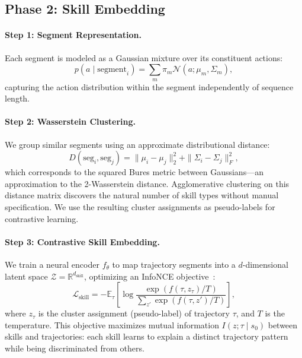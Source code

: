 \documentclass{article}
\begin{document}
\subsection{Phase 2: Skill Embedding}

\paragraph{Step 1: Segment Representation.}
Each segment is modeled as a Gaussian mixture over its constituent actions:
\begin{equation}
p(a \mid \text{segment}_i) = \sum_{m} \pi_m \mathcal{N}(a; \mu_m, \Sigma_m),
\end{equation}
capturing the action distribution within the segment independently of sequence length.

\paragraph{Step 2: Wasserstein Clustering.}
We group similar segments using an approximate distributional distance:
\begin{equation}
D(\text{seg}_i, \text{seg}_j) = \| \mu_i - \mu_j \|_2^2 + \| \Sigma_i - \Sigma_j \|_F^2,
\label{eq:bures}
\end{equation}
which corresponds to the squared Bures metric between Gaussians---an approximation to the 2-Wasserstein distance. Agglomerative clustering on this distance matrix discovers the natural number of skill types without manual specification. We use the resulting cluster assignments as pseudo-labels for contrastive learning.

\paragraph{Step 3: Contrastive Skill Embedding.}
We train a neural encoder $f_\theta$ to map trajectory segments into a $d$-dimensional latent space $\mathcal{Z} = \mathbb{R}^{d_{\text{skill}}}$, optimizing an InfoNCE objective~\cite{oord2018cpc}:
\begin{equation}
\mathcal{L}_{\text{skill}} = -\mathbb{E}_{\tau} \left[ \log \frac{\exp(f(\tau, z_\tau)/T)}{\sum_{z'} \exp(f(\tau, z')/T)} \right],
\label{eq:infonce}
\end{equation}
where $z_\tau$ is the cluster assignment (pseudo-label) of trajectory $\tau$, and $T$ is the temperature. This objective maximizes mutual information $I(z; \tau \mid s_0)$ between skills and trajectories: each skill learns to explain a distinct trajectory pattern while being discriminated from others.
\end{document}
